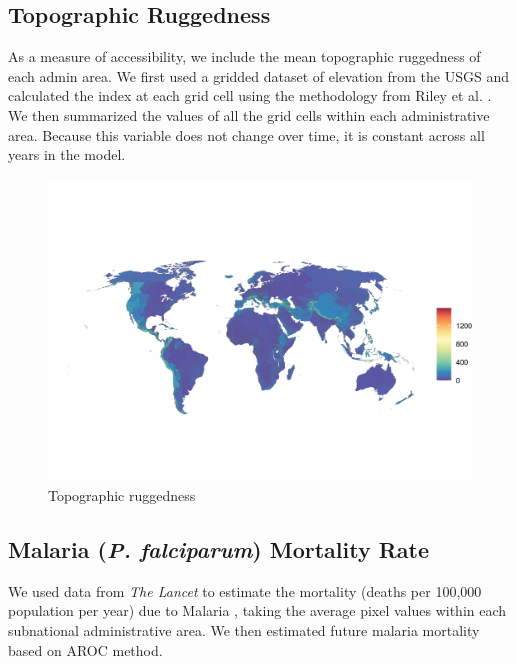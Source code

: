 \documentclass{article}
\begin{document}
\subsection{Topographic Ruggedness}
As a measure of accessibility, we include the mean topographic ruggedness of each admin area.  We first used a gridded dataset of elevation from the USGS \cite{USGS1996} and calculated the index at each grid cell using the methodology from Riley et al. \citep{Riley1999}.  We then summarized the values of all the grid cells within each administrative area.  Because this variable does not change over time, it is constant across all years in the model.

\begin{figure}[H]
  \centering
  \includegraphics[width=\linewidth]{img/covars/ruggedness.png}
  \caption{Topographic ruggedness}
\end{figure}

\subsection{Malaria (\textit{P. falciparum}) Mortality Rate}
We used data from \textit{The Lancet} to estimate the mortality (deaths per 100,000 population per year) due to Malaria \citep{Weiss2019}, taking the average pixel values within each subnational administrative area.  We then estimated future malaria mortality based on AROC method.
\end{document}
